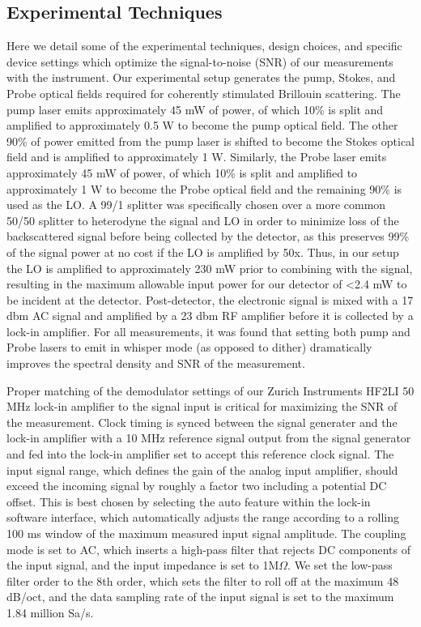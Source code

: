 \documentclass[%
  reprint,
  superscriptaddress,
  amsmath,amssymb,
  aps,
  prapplied,
]{revtex4-2}
\begin{document}
\subsection*{Experimental Techniques}
\label{Methods:Experimental Techniques}
Here we detail some of the experimental techniques, design choices, and specific device settings which optimize the signal-to-noise (SNR) of our measurements with the instrument. Our experimental setup generates the pump, Stokes, and Probe optical fields required for coherently stimulated Brillouin scattering. The pump laser emits approximately 45 mW of power, of which 10\% is split and amplified to approximately 0.5 W to become the pump optical field. The other 90\% of power emitted from the pump laser is shifted to become the Stokes optical field and is amplified to approximately 1 W. Similarly, the Probe laser emits approximately 45 mW of power, of which 10\% is split and amplified to approximately 1 W to become the Probe optical field and the remaining 90\% is used as the LO. A 99/1 splitter was specifically chosen over a more common 50/50 splitter to heterodyne the signal and LO in order to minimize loss of the backscattered signal before being collected by the detector, as this preserves 99\% of the signal power at no cost if the LO is amplified by 50x. Thus, in our setup the LO is amplified to approximately 230 mW prior to combining with the signal, resulting in the maximum allowable input power for our detector of <2.4 mW to be incident at the detector. Post-detector, the electronic signal is mixed with a 17 dbm AC signal and amplified by a 23 dbm RF amplifier before it is collected by a lock-in amplifier. For all measurements, it was found that setting both pump and Probe lasers to emit in whisper mode (as opposed to dither) dramatically improves the spectral density and SNR of the measurement.

Proper matching of the demodulator settings of our Zurich Instruments HF2LI 50 MHz lock-in amplifier to the signal input is critical for maximizing the SNR of the measurement. Clock timing is synced between the signal generater and the lock-in amplifier with a 10 MHz reference signal output from the signal generator and fed into the lock-in amplifier set to accept this reference clock signal. The input signal range, which defines the gain of the analog input amplifier, should exceed the incoming signal by roughly a factor two including a potential DC offset. This is best chosen by selecting the auto feature within the lock-in software interface, which automatically adjusts the range according to a rolling 100 ms window of the maximum measured input signal amplitude. The coupling mode is set to AC, which inserts a high-pass filter that rejects DC components of the input signal, and the input impedance is set to 1M$\Omega$. We set the low-pass filter order to the 8th order, which sets the filter to roll off at the maximum 48 dB/oct, and the data sampling rate of the input signal is set to the maximum 1.84 million Sa/s.
\end{document}
